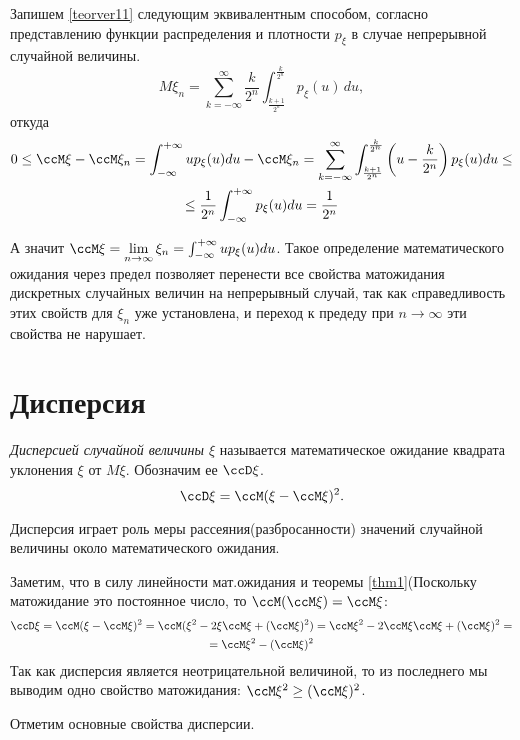 Запишем \eqref{teorver11} следующим эквивалентным способом, согласно представлению функции распределения и плотности $p_\xi$ в случае непрерывной случайной величины.
$$
M\xi_n = \sum\limits^{\infty}_{k=-\infty} \frac{k}{2^n}\int_{\frac{k+1}{2^n}}^{\frac{k}{2^n}}p_\xi(u)\,du,
$$
откуда 
\begin{multline*}
0\le \ccM\xi-\ccM\xi_n=\int_{-\infty}^{+\infty}up_\xi(u)du - \ccM\xi_n = \sum\limits^{\infty}_{k=-\infty}\int_{\frac{k+1}{2^n}}^{\frac{k}{2^n}}\left(u-\frac{k}{2^n}\right)p_\xi(u)du \le \\ \le \frac{1}{2^n}\int_{-\infty}^{+\infty}p_\xi(u)du=\frac{1}{2^n}
\end{multline*}

А значит $\ccM\xi=\lim\limits_{n\to\infty}\xi_n=\int_{-\infty}^{+\infty}up_\xi(u)du$. Такое определение математического ожидания через предел позволяет перенести все свойства матожидания дискретных случайных величин на непрерывный случай, так как cправедливость этих свойств для $\xi_n$ уже установлена, и переход к предеду при $n\to\infty$ эти свойства не нарушает.


\section{Дисперсия}
\begin{defn}
\textit{Дисперсией случайной величины $\xi$} называется математическое ожидание квадрата уклонения $\xi$ от $M\xi$. Обозначим ее $\ccD\xi$. 
\begin{equation} \label{ch31.4eq1}
\ccD\xi=\ccM(\xi-\ccM\xi)^2.
\end{equation}
\end{defn}

Дисперсия играет роль меры рассеяния(разбросанности) значений случайной величины около математического ожидания.

Заметим, что в силу линейности мат.ожидания и теоремы \ref{thm1}\;(Поскольку матожидание это постоянное число, то $\ccM(\ccM\xi)=\ccM\xi$:
\begin{multline*}
\ccD\xi = \ccM(\xi-\ccM\xi)^2=\ccM(\xi^2-2\xi \ccM\xi+(\ccM\xi)^2)=\ccM\xi^2-2\ccM\xi \ccM\xi+(\ccM\xi)^2=\\=\ccM\xi^2-(\ccM\xi)^2
\end{multline*}
Так как дисперсия является неотрицательной величиной, то из последнего мы выводим одно свойство матожидания: $\ccM\xi^2\ge(\ccM\xi)^2$.

Отметим основные свойства дисперсии.

